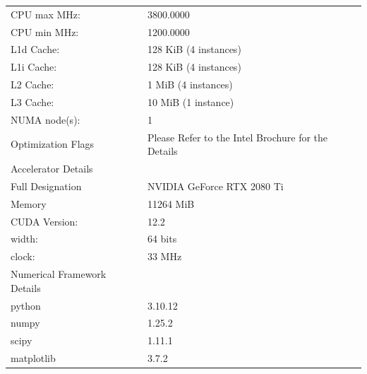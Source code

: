 {\begin{table}[!htbp]
\begin{tabular}{||l l||}
     CPU max MHz:                 & 3800.0000 	                                         	  \\
     CPU min MHz:                 & 1200.0000                                         	  	\\
     L1d Cache:                   & 128 KiB (4 instances)                           	    	\\
     L1i Cache:                   & 128 KiB (4 instances) 	 	                              \\
     L2 Cache:                    & 1 MiB (4 instances) 	                                 	\\
     L3 Cache:                    & 10 MiB (1 instance) 	 	                                \\
     NUMA node(s):                & 1                                               	 	    \\
     Optimization Flags           & Please Refer to the Intel Brochure for the Details  		\\[1ex] 
     \hline
     \hline
     Accelerator Details 			    &  					                                            	\\[0.5ex] 
     \hline\hline
     Full Designation 	    			& NVIDIA GeForce RTX 2080 Ti 	                            \\ 
     Memory   	              		& 11264 MiB 	                                           	\\
     CUDA Version:                & 12.2  	                                               	\\
     width:                       & 64 bits                                                 \\
     clock:                       & 33 MHz 	                                                \\[1ex] 
     \hline
     \hline
     Numerical Framework Details	&  				                                            		\\[0.5ex] 
     \hline\hline
     python                       & 3.10.12                                                 \\
     numpy                        & 1.25.2  		                                            \\
     scipy                        & 1.11.1  		                                            \\
     matplotlib                   & 3.7.2   		                                            \\

\end{tabular}
\end{table}}
